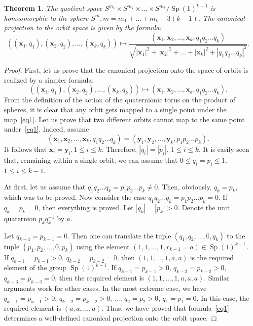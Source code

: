 \documentclass[english, 12pt]{amsproc}
\newcounter{thcounter}
\numberwithin{equation}{section}
\theoremstyle{plain}
\newtheorem{thm}[thcounter]{Theorem}
\theoremstyle{definition}
\theoremstyle{remark}
\DeclareMathOperator{\Sp}{Sp}
\newcommand{\xb}{\mathbf{x}}
\newcommand{\yb}{\mathbf{y}}
\begin{document}
\begin{thm}\label{thmQuaternionic}
The quotient space $S^{m_1}\times S^{m_2}\times \ldots \times S^{m_k}/\Sp(1)^{k-1}$ is homeomorphic to the sphere $S^m, m = m_1+\ldots + m_k - 3(k-1)$. The canonical projection to the orbit space is given by the formula:
\begin{equation}\label{eqTwoStars}
((\xb_1, q_1), (\xb_2, q_2), \ldots, (\xb_k, q_k)) \mapsto \frac{(\xb_1, \xb_2, \ldots, \xb_k, q_1q_2\ldots q_k)}{\sqrt{ |\xb_1|^2 + |\xb_2|^2 +  \ldots +  |\xb_k|^2 + |q_1q_2\ldots q_k|^2 }}.
\end{equation}
\end{thm}

\begin{proof}
First, let us prove that the canonical projection onto the space of orbits is realized by a simpler formula:
\begin{equation}\label{eq1}
((\xb_1, q_1), (\xb_2, q_2), \ldots, (\xb_k, q_k)) \mapsto (\xb_1, \xb_2, \ldots, \xb_k, q_1q_2\ldots q_k).
\end{equation}
From the definition of the action of the quaternionic torus on the product of spheres, it is clear that any orbit gets mapped to a single point under the map~\eqref{eq1}. Let us prove that two different orbits cannot map to the same point under~\eqref{eq1}. Indeed, assume
\begin{equation}\label{eq2}
(\xb_1, \xb_2, \ldots, \xb_k, q_1q_2\ldots q_k) = (\yb_1, \yb_2, \ldots, \yb_k, p_1p_2\ldots p_k).
\end{equation}
It follows that $\xb_i = \yb_i, 1\leqslant i\leqslant k$. Therefore, $|q_i|=|p_i|$, $1\leqslant i\leqslant k$. It is easily seen that, remaining within a single orbit, we can assume that $0\leqslant q_i=p_i\leqslant 1$, $1\leqslant i\leqslant k-1$.

At first, let us assume that $q_1q_2\ldots q_k = p_1p_2\ldots p_k \neq 0$. Then, obviously, $q_k=p_k$, which was to be proved. Now consider the case $q_1q_2\ldots q_k = p_1p_2\ldots p_k = 0$. If $q_k = p_k = 0$, then everything is proved. Let $|q_k| = |p_k| > 0$. Denote the unit quaternion $p_kq_k^{-1}$ by $a$.

Let $q_{k-1}=p_{k-1}=0$. Then one can translate the tuple $(q_1,q_2, \ldots, 0, q_k)$ to the tuple $(p_1,p_2,\ldots, 0, p_k)$ using the element $(1,1,\ldots, 1, r_{k-1}= a)\in \Sp(1)^{k-1}$. If $q_{k-1} = p_{k-1} > 0$, $q_{k-2} = p_{k-2} = 0$, then $(1,1,\ldots,1,a,a)$ is the required element of the group $\Sp(1)^{k-1}$. If $q_{k-1} = p_{k-1} > 0$, $q_{k-2} = p_{k-2} > 0$, $q_{k-3} = p_{k-3} = 0$, then the required element is $(1,1,\ldots,1,a,a,a)$. Similar arguments work for other cases. In the most extreme case, we have $q_{k-1} = p_{k-1} > 0$, $q_{k-2} = p_{k-2} > 0$, $\ldots$, $q_2 = p_2 > 0$, $q_1 = p_1 = 0$. In this case, the required element is $(a,a,\ldots,a)$. Thus, we have proved that formula~\eqref{eq1} determines a well-defined canonical projection onto the orbit space.


\end{proof}
\end{document}
